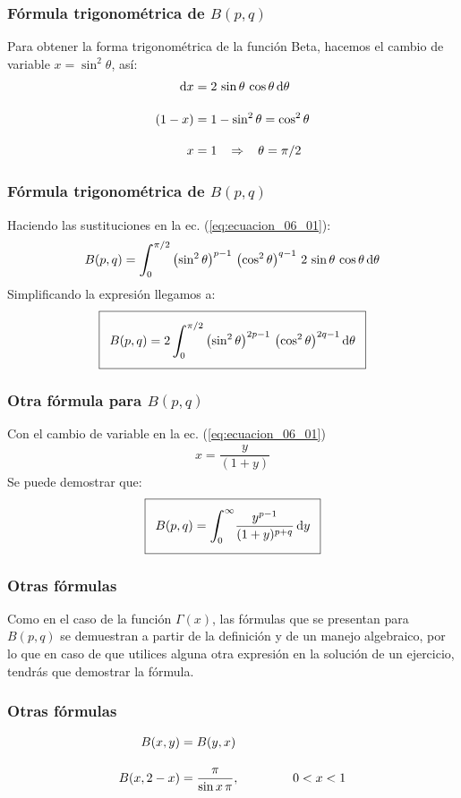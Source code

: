 \documentclass[12pt]{beamer}
\begin{document}
\begin{frame}
\frametitle{Fórmula trigonométrica de $B (p,q)$}
Para obtener la forma trigonométrica de la función Beta, hacemos el cambio de variable $x = \sin^{2} \theta$, así:
\pause
\begin{align*}
\dd{x} &= 2 \, \sin \theta \, \cos \theta \dd{\theta} \\[1em]
(1 - x) &= 1 - \sin^{2} \theta = \cos^{2} \theta \\[1em]
x &= 1 \hspace{0.3cm} \Rightarrow \hspace{0.3cm} \theta = \pi/2
\end{align*}
\end{frame}
\begin{frame}
\frametitle{Fórmula trigonométrica de $B (p, q)$}
Haciendo las sustituciones en la ec. (\ref{eq:ecuacion_06_01}):
\pause
{\fontsize{12}{12}\selectfont
\begin{align}
B(p, q) = \scaleint{6ex}_{\bs 0}^{\pi/2} \left( \sin^{2} \theta \right)^{p-1} \, \left( \cos^{2} \theta \right)^{q-1} \, 2 \, \sin \theta \, \cos \theta \dd{\theta}
\end{align}}
\pause
Simplificando la expresión llegamos a:
{\fontsize{12}{12}\selectfont
\begin{align}
\addtolength{\fboxsep}{5pt}\boxed{B(p, q) = 2 \, \scaleint{6ex}_{\bs 0}^{\pi/2} \left( \sin^{2} \theta \right)^{2p-1} \, \left( \cos^{2} \theta \right)^{2q-1} \dd{\theta}}
\label{eq:ecuacion_06_04}
\end{align}}
\end{frame}
\begin{frame}
\frametitle{Otra fórmula para $B(p, q)$}
Con el cambio de variable en la ec. (\ref{eq:ecuacion_06_01})
\begin{align*}
x = \dfrac{y}{(1 + y)}
\end{align*}
\pause
Se puede demostrar que:
\begin{align}
\addtolength{\fboxsep}{5pt}\boxed{B(p, q) = \scaleint{6ex}_{\bs 0}^{\infty} \dfrac{y^{p-1}}{(1 + y)^{p+q}} \dd{y}}
\label{eq:ecuacion_06_05}
\end{align}   
\end{frame}
\begin{frame}
\frametitle{Otras fórmulas}
Como en el caso de la función $\Gamma (x)$, las fórmulas que se presentan para $B(p, q)$ se demuestran a partir de la definición y de un manejo algebraico, \pause por lo que en caso de que utilices alguna otra expresión en la solución de un ejercicio, tendrás que demostrar la fórmula.
\end{frame}
\begin{frame}
\frametitle{Otras fórmulas}
\begin{align*}
B (x, y) &= B (y, x) \\[1em]
B (x, 2-x) &= \dfrac{\pi}{\sin x \, \pi}, \hspace{1.5cm} 0 < x < 1   
\end{align*}
\end{frame}
\end{document}
